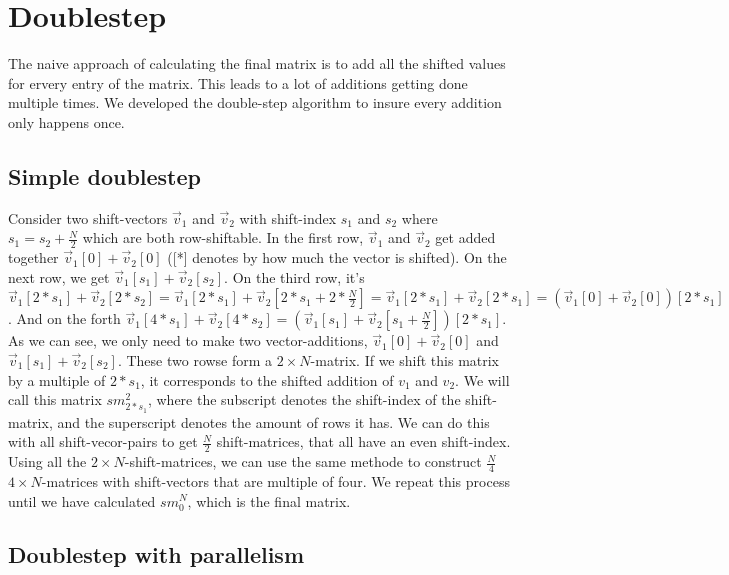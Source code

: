 \documentclass[12pt]{article}
\begin{document}
\section{ Doublestep }

The naive approach of calculating the final matrix is to add all the shifted values for ervery entry of the matrix. This leads to a lot of additions getting done multiple times. We developed the double-step algorithm to insure every addition only happens once.

\subsection{ Simple doublestep }

Consider two shift-vectors $\vec{v}_1$ and $\vec{v}_2$ with shift-index $s_1$ and $s_2$ where $s_1 = s_2+\frac{N}{2}$ which are both row-shiftable. In the first row, $\vec{v}_1$ and $\vec{v}_2$ get added together $\vec{v}_1[0]+\vec{v}_2[0]$ ([*] denotes by how much the vector is shifted). On the next row, we get $\vec{v}_1[s_1]+\vec{v}_2[s_2]$. On the third row, it's $\vec{v}_1[2*s_1]+\vec{v}_2[2*s_2] = \vec{v}_1[2*s_1]+\vec{v}_2[2*s_1+2*\frac{N}{2}] = \vec{v}_1[2*s_1]+\vec{v}_2[2*s_1] = (\vec{v}_1[0]+\vec{v}_2[0])[2*s_1] $. And on the forth $\vec{v}_1[4*s_1]+\vec{v}_2[4*s_2] = (\vec{v}_1[s_1]+\vec{v}_2[s_1 +\frac{N}{2}])[2*s_1]$.\\

As we can see, we only need to make two vector-additions, $\vec{v}_1[0]+\vec{v}_2[0]$ and $\vec{v}_1[s_1]+\vec{v}_2[s_2]$. These two rowse form a $2\times N$-matrix. If we shift this matrix by a multiple of $2*s_1$, it corresponds to the shifted addition of $v_1$ and $v_2$. We will call this matrix $sm_{2*s_1}^2$, where the subscript denotes the shift-index of the shift-matrix, and the superscript denotes the amount of rows it has. We can do this with all shift-vecor-pairs to get $\frac{N}{2}$ shift-matrices, that all have an even shift-index.\\

Using all the $2\times N$-shift-matrices, we can use the same methode to construct $\frac{N}{4}$ $4\times N$-matrices with shift-vectors that are multiple of four. We repeat this process until we have calculated $sm_{0}^N$, which is the final matrix.

\subsection{ Doublestep with parallelism }
\end{document}
